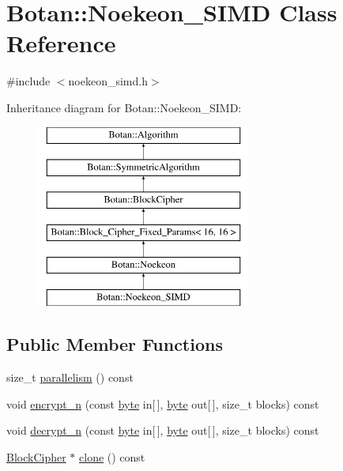 \hypertarget{classBotan_1_1Noekeon__SIMD}{\section{Botan\-:\-:Noekeon\-\_\-\-S\-I\-M\-D Class Reference}
\label{classBotan_1_1Noekeon__SIMD}
}


{\ttfamily \#include $<$noekeon\-\_\-simd.\-h$>$}

Inheritance diagram for Botan\-:\-:Noekeon\-\_\-\-S\-I\-M\-D\-:\begin{figure}[H]
\begin{center}
\leavevmode
\includegraphics[height=6.000000cm]{classBotan_1_1Noekeon__SIMD}
\end{center}
\end{figure}
\subsection*{Public Member Functions}
\begin{DoxyCompactItemize}
\item 
size\-\_\-t \hyperlink{classBotan_1_1Noekeon__SIMD_ad3c3f7932218b1b1f78b409accb6e4fe}{parallelism} () const 
\item 
void \hyperlink{classBotan_1_1Noekeon__SIMD_a67374a62684d442b17d57ec8f50f7fac}{encrypt\-\_\-n} (const \hyperlink{namespaceBotan_a7d793989d801281df48c6b19616b8b84}{byte} in\mbox{[}$\,$\mbox{]}, \hyperlink{namespaceBotan_a7d793989d801281df48c6b19616b8b84}{byte} out\mbox{[}$\,$\mbox{]}, size\-\_\-t blocks) const 
\item 
void \hyperlink{classBotan_1_1Noekeon__SIMD_a3007c5718d7d1bf9a74c9ffdc7bf92ce}{decrypt\-\_\-n} (const \hyperlink{namespaceBotan_a7d793989d801281df48c6b19616b8b84}{byte} in\mbox{[}$\,$\mbox{]}, \hyperlink{namespaceBotan_a7d793989d801281df48c6b19616b8b84}{byte} out\mbox{[}$\,$\mbox{]}, size\-\_\-t blocks) const 
\item 
\hyperlink{classBotan_1_1BlockCipher}{Block\-Cipher} $\ast$ \hyperlink{classBotan_1_1Noekeon__SIMD_ab313c741ca743b883f53652f7b2c6fd5}{clone} () const 
\end{DoxyCompactItemize}
